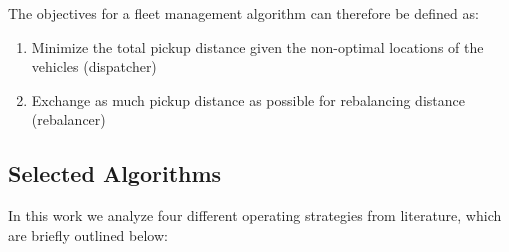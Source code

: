 The objectives for a fleet management algorithm can therefore be defined as:

\begin{enumerate}
\item Minimize the total pickup distance given the non-optimal locations of the vehicles (dispatcher)
\item Exchange as much pickup distance as possible for rebalancing distance (rebalancer)
\end{enumerate}

\subsection{Selected Algorithms}

In this work we analyze four different operating strategies from literature,
which are briefly outlined below:

